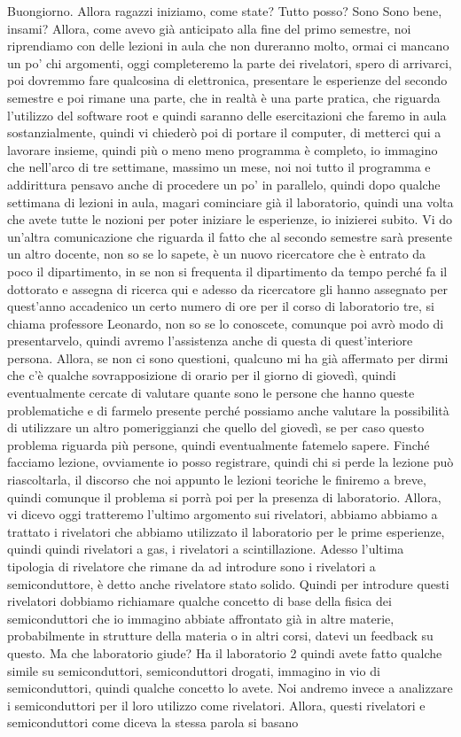 Buongiorno. Allora ragazzi iniziamo, come state? Tutto posso? Sono Sono bene, insami? Allora, come avevo già anticipato alla fine del primo semestre, noi riprendiamo con delle lezioni in aula che non dureranno molto, ormai ci mancano un po' chi argomenti, oggi completeremo la parte dei rivelatori, spero di arrivarci, poi dovremmo fare qualcosina di elettronica, presentare le esperienze del secondo semestre e poi rimane una parte, che in realtà è una parte pratica, che riguarda l'utilizzo del software root e quindi saranno delle esercitazioni che faremo in aula sostanzialmente, quindi vi chiederò poi di portare il computer, di metterci qui a lavorare insieme, quindi più o meno meno programma è completo, io immagino che nell'arco di tre settimane, massimo un mese, noi noi tutto il programma e addirittura pensavo anche di procedere un po' in parallelo, quindi dopo qualche settimana di lezioni in aula, magari cominciare già il laboratorio, quindi una volta che avete tutte le nozioni per poter iniziare le esperienze, io inizierei subito. Vi do un'altra comunicazione che riguarda il fatto che al secondo semestre sarà presente un altro docente, non so se lo sapete, è un nuovo ricercatore che è entrato da poco il dipartimento, in se non si frequenta il dipartimento da tempo perché fa il dottorato e assegna di ricerca qui e adesso da ricercatore gli hanno assegnato per quest'anno accadenico un certo numero di ore per il corso di laboratorio tre, si chiama professore Leonardo, non so se lo conoscete, comunque poi avrò modo di presentarvelo, quindi avremo l'assistenza anche di questa di quest'interiore persona. Allora, se non ci sono questioni, qualcuno mi ha già affermato per dirmi che c'è qualche sovrapposizione di orario per il giorno di giovedì, quindi eventualmente cercate di valutare quante sono le persone che hanno queste problematiche e di farmelo presente perché possiamo anche valutare la possibilità di utilizzare un altro pomeriggianzi che quello del giovedì, se per caso questo problema riguarda più persone, quindi eventualmente fatemelo sapere. Finché facciamo lezione, ovviamente io posso registrare, quindi chi si perde la lezione può riascoltarla, il discorso che noi appunto le lezioni teoriche le finiremo a breve, quindi comunque il problema si porrà poi per la presenza di laboratorio. Allora, vi dicevo oggi tratteremo l'ultimo argomento sui rivelatori, abbiamo abbiamo a trattato i rivelatori che abbiamo utilizzato il laboratorio per le prime esperienze, quindi quindi rivelatori a gas, i rivelatori a scintillazione. Adesso l'ultima tipologia di rivelatore che rimane da ad introdure sono i rivelatori a semiconduttore, è detto anche rivelatore stato solido. Quindi per introdure questi rivelatori dobbiamo richiamare qualche concetto di base della fisica dei semiconduttori che io immagino abbiate affrontato già in altre materie, probabilmente in strutture della materia o in altri corsi, datevi un feedback su questo. Ma che laboratorio giude? Ha il laboratorio 2 quindi avete fatto qualche simile su semiconduttori, semiconduttori drogati, immagino in vio di semiconduttori, quindi qualche concetto lo avete. Noi andremo invece a analizzare i semiconduttori per il loro utilizzo come rivelatori. Allora, questi rivelatori e semiconduttori come diceva la stessa parola si basano 